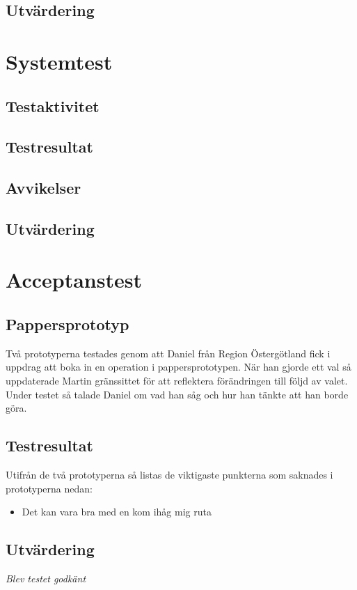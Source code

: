 \documentclass[a4paper,10pt]{article}
\begin{document}
\subsection{Utvärdering}
\section{Systemtest}
\subsection{Testaktivitet}
\subsection{Testresultat}
\subsection{Avvikelser}
\subsection{Utvärdering}
\section{Acceptanstest}
\subsection{Pappersprototyp}
Två prototyperna testades genom att Daniel från Region Östergötland fick i uppdrag att boka in en operation i pappersprototypen. När han gjorde ett val så uppdaterade Martin gränssittet för att reflektera förändringen till följd av valet. Under testet så talade Daniel om vad han såg och hur han tänkte att han borde göra.
\subsection{Testresultat}
Utifrån de två prototyperna så listas de viktigaste punkterna som saknades i prototyperna nedan:
\begin{itemize}
\item Det kan vara bra med en kom ihåg mig ruta
\end{itemize}
\subsection{Utvärdering}
\emph{Blev testet godkänt}
\end{document}
